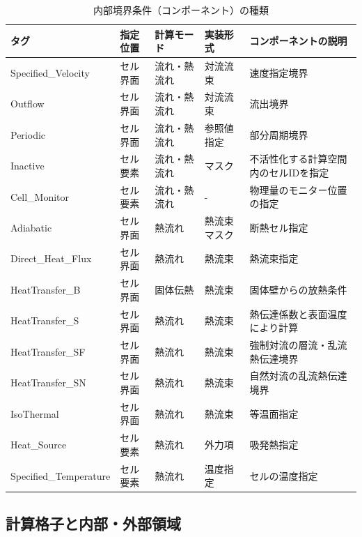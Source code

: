\begin{table}[htdp]
\caption{内部境界条件（コンポーネント）の種類}
\begin{center}
\small
\begin{tabular}{lllll} \toprule
タグ & 指定位置 & 計算モード & 実装形式 & コンポーネントの説明\\ \midrule
Specified\_Velocity & セル界面 & 流れ・熱流れ & 対流流束 & 速度指定境界\\
Outflow & セル界面 & 流れ・熱流れ & 対流流束 & 流出境界\\
Periodic & セル界面 & 流れ・熱流れ & 参照値指定 & 部分周期境界\\
Inactive & セル要素 & 流れ・熱流れ & マスク & 不活性化する計算空間内のセルIDを指定\\
Cell\_Monitor & セル要素 & 流れ・熱流れ & - & 物理量のモニター位置の指定\\ 
Adiabatic & セル界面 & 熱流れ & 熱流束マスク & 断熱セル指定\\
Direct\_Heat\_Flux & セル界面 & 熱流れ & 熱流束 & 熱流束指定\\
HeatTransfer\_B & セル界面 & 固体伝熱 & 熱流束 & 固体壁からの放熱条件\\
HeatTransfer\_S & セル界面 & 熱流れ & 熱流束 & 熱伝達係数と表面温度により計算\\
HeatTransfer\_SF & セル界面 & 熱流れ & 熱流束 & 強制対流の層流・乱流熱伝達境界\\
HeatTransfer\_SN & セル界面 & 熱流れ & 熱流束 & 自然対流の乱流熱伝達境界\\
IsoThermal & セル界面 & 熱流れ & 熱流束 & 等温面指定\\
Heat\_Source & セル要素 & 熱流れ & 外力項 & 吸発熱指定\\
Specified\_Temperature & セル要素 & 熱流れ & 温度指定 & セルの温度指定\\
\bottomrule
\end{tabular}
\end{center}
\label{tbl:tag_ibc}
\end{table}


%
\pagebreak
\hypertarget{tgt:grid_arrangement}{\subsection{計算格子と内部・外部領域}}

